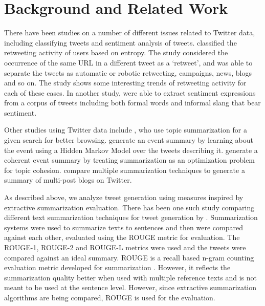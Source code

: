 \section{Background and Related Work}
\label{sec:background}

There have been studies on a number of different issues related to Twitter data, including classifying tweets and sentiment analysis of tweets.  classified the retweeting activity of users based on entropy. The study considered the occurrence of the same URL in a different tweet as a ‘retweet’, and was able to separate the tweets as automatic or robotic retweeting, campaigns, news, blogs and so on. The study shows some interesting trends of retweeting activity for each of these cases. In another study,  were able to extract sentiment expressions from a corpus of tweets including both formal words and informal slang that bear sentiment.

Other studies using Twitter data include , who use topic summarization for a given search for better browsing.  generate an event summary by learning about the event using a Hidden Markov Model over the tweets describing it.  generate a coherent event summary by treating summarization as an optimization problem for topic cohesion.  compare multiple summarization techniques to generate a summary of multi-post blogs on Twitter.

As described above, we analyze tweet generation using measures inspired by extractive summarization evaluation. There has been one such study comparing different text summarization techniques for tweet generation by  . Summarization systems were used to summarize texts to sentences and then were compared against each other, evaluated using the ROUGE metric for evaluation. The ROUGE-1, ROUGE-2 and ROUGE-L metrics were used and the tweets were compared against an ideal summary. ROUGE \cite{lin2004rouge} is a recall based n-gram counting evaluation metric developed for summarization \cite{nenkova2006summarization}. However, it reflects the summarization quality better when used with multiple reference texts and is not meant to be used at the sentence level. However, since extractive summarization algorithms are being compared, ROUGE is used for the evaluation. 

